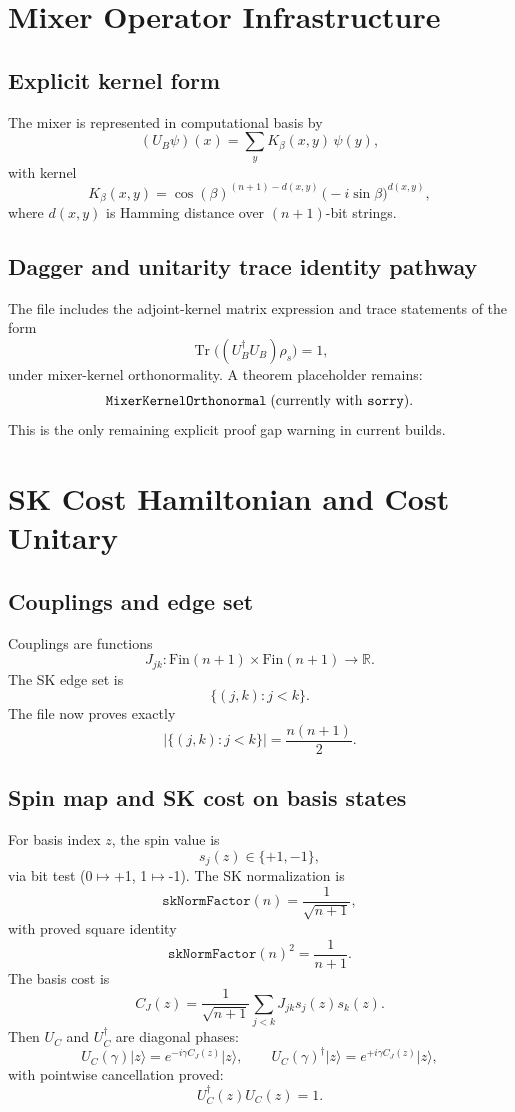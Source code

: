 \documentclass[11pt]{article}
\newcommand{\R}{\mathbb{R}}
\newcommand{\tr}{\operatorname{Tr}}
\newcommand{\ket}[1]{\lvert #1\rangle}
\begin{document}
\section{Mixer Operator Infrastructure}
\subsection{Explicit kernel form}
The mixer is represented in computational basis by
\[
  (U_B\psi)(x) = \sum_y K_\beta(x,y)\,\psi(y),
\]
with kernel
\[
  K_\beta(x,y)=\cos(\beta)^{(n+1)-d(x,y)}\,\bigl(-i\sin\beta\bigr)^{d(x,y)},
\]
where \(d(x,y)\) is Hamming distance over \((n+1)\)-bit strings.

\subsection{Dagger and unitarity trace identity pathway}
The file includes the adjoint-kernel matrix expression and trace statements of the form
\[
  \tr\big((U_B^\dagger U_B)\rho_s\big)=1,
\]
under mixer-kernel orthonormality. A theorem placeholder remains:
\[
  \texttt{MixerKernelOrthonormal}\;\text{(currently with \texttt{sorry}).}
\]
This is the only remaining explicit proof gap warning in current builds.

\section{SK Cost Hamiltonian and Cost Unitary}
\subsection{Couplings and edge set}
Couplings are functions
\[
  J_{jk}:\mathrm{Fin}(n+1)\times\mathrm{Fin}(n+1)\to\R.
\]
The SK edge set is
\[
  \{(j,k): j<k\}.
\]
The file now proves exactly
\[
  |\{(j,k):j<k\}|=\frac{n(n+1)}{2}.
\]

\subsection{Spin map and SK cost on basis states}
For basis index \(z\), the spin value is
\[
  s_j(z)\in\{+1,-1\},
\]
via bit test (0\(\mapsto\)+1, 1\(\mapsto\)-1). The SK normalization is
\[
  \texttt{skNormFactor}(n)=\frac{1}{\sqrt{n+1}},
\]
with proved square identity
\[
  \texttt{skNormFactor}(n)^2=\frac{1}{n+1}.
\]
The basis cost is
\[
  C_J(z)=\frac{1}{\sqrt{n+1}}\sum_{j<k}J_{jk}s_j(z)s_k(z).
\]
Then \(U_C\) and \(U_C^\dagger\) are diagonal phases:
\[
  U_C(\gamma)\ket{z}=e^{-i\gamma C_J(z)}\ket{z},\qquad
  U_C(\gamma)^\dagger\ket{z}=e^{+i\gamma C_J(z)}\ket{z},
\]
with pointwise cancellation proved:
\[
  U_C^\dagger(z)U_C(z)=1.
\]
\end{document}
